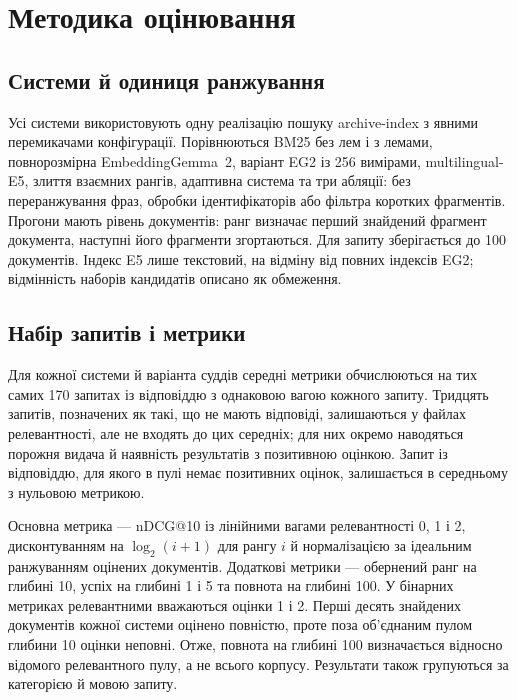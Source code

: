 \section{Методика оцінювання}\label{sec:method}

\subsection{Системи й одиниця ранжування}
Усі системи використовують одну реалізацію пошуку archive-index з явними перемикачами конфігурації. Порівнюються BM25 без лем і з лемами, повнорозмірна EmbeddingGemma~2, варіант EG2 із 256 вимірами, multilingual-E5, злиття взаємних рангів, адаптивна система та три абляції: без переранжування фраз, обробки ідентифікаторів або фільтра коротких фрагментів. Прогони мають рівень документів: ранг визначає перший знайдений фрагмент документа, наступні його фрагменти згортаються. Для запиту зберігається до 100 документів. Індекс E5 лише текстовий, на відміну від повних індексів EG2; відмінність наборів кандидатів описано як обмеження.

\subsection{Набір запитів і метрики}
Для кожної системи й варіанта суддів середні метрики обчислюються на тих самих 170 запитах із відповіддю з однаковою вагою кожного запиту. Тридцять запитів, позначених як такі, що не мають відповіді, залишаються у файлах релевантності, але не входять до цих середніх; для них окремо наводяться порожня видача й наявність результатів з позитивною оцінкою. Запит із відповіддю, для якого в пулі немає позитивних оцінок, залишається в середньому з нульовою метрикою.

Основна метрика — nDCG@10 із лінійними вагами релевантності 0, 1 і 2, дисконтуванням на $\log_2(i+1)$ для рангу $i$ й нормалізацією за ідеальним ранжуванням оцінених документів. Додаткові метрики — обернений ранг на глибині 10, успіх на глибині 1 і 5 та повнота на глибині 100. У бінарних метриках релевантними вважаються оцінки 1 і 2. Перші десять знайдених документів кожної системи оцінено повністю, проте поза об'єднаним пулом глибини 10 оцінки неповні. Отже, повнота на глибині 100 визначається відносно відомого релевантного пулу, а не всього корпусу. Результати також групуються за категорією й мовою запиту.

